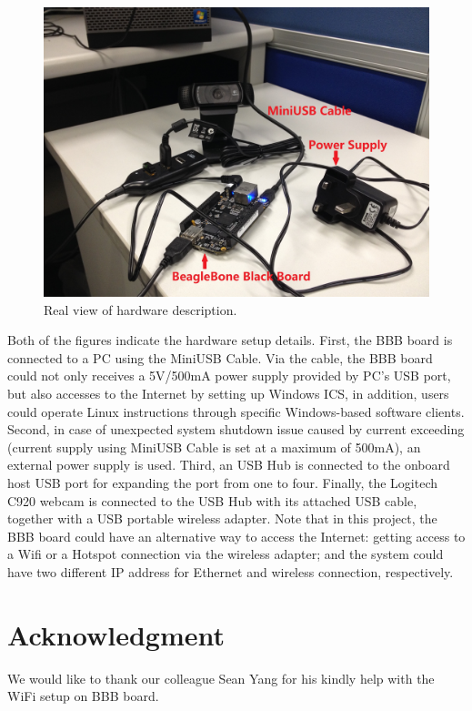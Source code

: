 \documentclass[12pt,journal,draftclsnofoot,onecolumn]{IEEEtran}
\begin{document}
\begin{figure}[ht]
	\centering
	\includegraphics[width=5in]{./figs/hw2.jpg}
	\caption{Real view of hardware description.}
	\label{hw2}
\end{figure}

Both of the figures indicate the hardware setup details. First, the BBB board is connected to a PC using the MiniUSB Cable. Via the cable, the BBB board could not only receives a 5V/500mA power supply provided by PC's USB port, but also accesses to the Internet by setting up Windows ICS, in addition, users could operate Linux instructions through specific Windows-based software clients. Second, in case of unexpected system shutdown issue caused by current exceeding (current supply using MiniUSB Cable is set at a maximum of 500mA), an external power supply is used. Third, an USB Hub is connected to the onboard host USB port for expanding the port from one to four. Finally, the Logitech C920 webcam is connected to the USB Hub with its attached USB cable, together with a USB portable wireless adapter. Note that in this project, the BBB board could have an alternative way to access the Internet: getting access to a Wifi or a Hotspot connection via the wireless adapter; and the system could have two different IP address for Ethernet and wireless connection, respectively.

\section*{Acknowledgment}
We would like to thank our colleague Sean Yang  for his kindly help with the WiFi setup on BBB board.


\begin{thebibliography}{1} 
\item
\end{thebibliography}
% 
\end{document}
